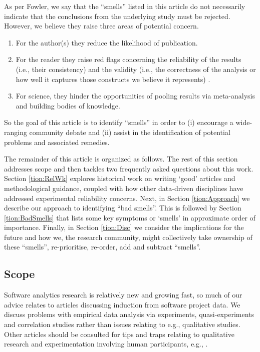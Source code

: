 \documentclass[10pt]{elsarticle}
\newcommand{\RED}{\color{black}}
\newcommand{\BLACK}{\color{black}}
\begin{document}
As per Fowler, we say that the ``smells''  listed in this article do not necessarily indicate that the conclusions from the underlying study must be rejected.  However, we believe they raise three areas of potential concern.
\begin{enumerate}
    \item For the author(s) they reduce the likelihood of publication.
    \item For the reader they raise red flags concerning the reliability of the results \RED (i.e., their consistency) and the validity (i.e., the correctness of the analysis or how well it captures those constructs we believe it represents) \BLACK.
    \item For science, they hinder the opportunities of pooling results via meta-analysis and building bodies of knowledge. 
\end{enumerate}
So the goal of this article is to identify ``smells'' in order to (i) encourage a wide-ranging community debate and (ii) assist in the identification of potential problems and associated remedies.  

The remainder of this article is organized as follows. The rest of this section addresses scope and then tackles two frequently asked questions about this work. Section \ref{tion:RelWk} explores historical work on writing `good' articles and methodological guidance, coupled with how other data-driven disciplines have addressed experimental reliability concerns.  Next, in Section \ref{tion:Approach} we describe our approach to identifying ``bad smells''.  This is followed by Section \ref{tion:BadSmells} that lists some key symptoms or `smells' in approximate order of importance.  Finally, in Section \ref{tion:Disc} we consider the implications for the future and how we, the research community, might collectively take ownership of these ``smells'', re-prioritise, re-order, add and subtract ``smells''.


\subsection{Scope}
Software analytics research is relatively new and growing fast, so much of our advice relates to articles discussing induction from software project data. We discuss problems with empirical data analysis via experiments, quasi-experiments and correlation studies \cite{Shad02} rather than issues relating to e.g., qualitative studies.  Other articles should be consulted for tips and traps relating to qualitative research and experimentation involving human participants, e.g., \cite{stol2016grounded,cruzes2011research,ko2015practical,petersen2015guidelines}.
\end{document}
